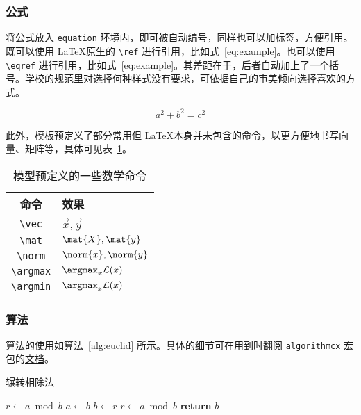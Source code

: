 \subsubsection{公式}

将公式放入 \verb|equation| 环境内，即可被自动编号，同样也可以加标签，方便引用。既可以使用 \LaTeX 原生的 \verb|\ref| 进行引用，比如式~\ref{eq:example}。也可以使用 \verb|\eqref| 进行引用，比如式~\eqref{eq:example}。其差距在于，后者自动加上了一个括号。学校的规范里对选择何种样式没有要求，可依据自己的审美倾向选择喜欢的方式。

\begin{equation}
\label{eq:example}
a^2 + b^2 = c^2
\end{equation}

此外，模板预定义了部分常用但 \LaTeX 本身并未包含的命令，以更方便地书写向量、矩阵等，具体可见表~\ref{table:math}。

\begin{table}[htb]
    \centering
    \caption{\label{table:math} 模型预定义的一些数学命令}
    \begin{tabularx}{.5\linewidth}{c X<{\centering\arraybackslash}}
        \hline
        命令 & 效果 \\
        \hline
        \verb|\vec| & $\vec{x}, \vec{y}$ \\
        \verb|\mat| & $\mat{X}, \mat{y}$ \\
        \verb|\norm| & $\norm{x}, \norm{y}$ \\
        \verb|\argmax| & $\argmax_{x}\mathcal{L}(x)$ \\
        \verb|\argmin| & $\argmax_{x}\mathcal{L}(x)$ \\
        \hline
    \end{tabularx}
\end{table}

\subsubsection{算法}

算法的使用如算法~\ref{alg:euclid} 所示。具体的细节可在用到时翻阅 \verb|algorithmcx| 宏包的\href{http://mirrors.ctan.org/macros/latex/contrib/algorithmicx/algorithmicx.pdf}{文档}。

\begin{algorithm}
    \caption{\label{alg:euclid} 辗转相除法}
    \begin{algorithmic}[1]
    \State $r\gets a\bmod b$
    \State $a\gets b$
    \State $b\gets r$
    \State $r\gets a\bmod b$
    \EndWhile\label{euclidendwhile}
    \State \textbf{return} $b$
    \EndProcedure
    \end{algorithmic}
\end{algorithm}

